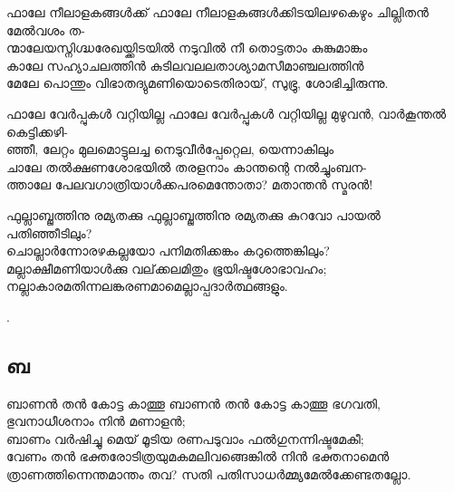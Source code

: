 \begin{enumerate}
\begin{slokam}{\VSr}{\KND}{ഫാലേ നീലാളകങ്ങൾക്ക്}
ഫാലേ നീലാളകങ്ങള്‍ക്കിടയിലഴകെഴും ചില്ലിതൻ മേൽവശം ത-\\
ന്മാലേയസ്നിഗ്ദ്ധരേഖയ്ക്കിടയിൽ നടുവിൽ നീ തൊട്ടതാം കുങ്കുമാങ്കം\\
കാലേ സഹ്യാചലത്തിൻ കുടിലവലലതാശ്യാമസീമാഞ്ചലത്തിൻ\\
മേലേ പൊന്തും വിഭാതദ്യുമണിയൊടെതിരായ്‌, സുഭ്രു, ശോഭിച്ചിരുന്നു.
\end{slokam}


\begin{slokam}{\VSv}{\VNM}{ഫാലേ വേർപ്പുകള്‍ വറ്റിയില്ല}
 ഫാലേ വേർപ്പുകള്‍ വറ്റിയില്ല മുഴുവൻ, വാർകൂന്തൽ കെട്ടിക്കഴി-\\
ഞ്ഞീ, ലേറ്റം മുലമൊട്ടുലച്ച നെടുവീർപ്പേറ്റെല, യെന്നാകിലും\\
ചാലേ തൽക്ഷണശോഭയിൽ തരളനാം കാന്തന്റെ നൽച്ചുംബന-\\
ത്താലേ പേലവഗാത്രിയാള്‍ക്കപരമെന്തോതാ? മതാന്തൻ സ്മരൻ!
\end{slokam}



\begin{slokam}{\VSv}{\KV}{ഫുല്ലാബ്ജത്തിനു രമ്യതക്കു}
ഫുല്ലാബ്ജത്തിനു രമ്യതക്കു കുറവോ പായല്‍ പതിഞ്ഞീടിലും?\\
ചൊല്ലാര്‍ന്നോരഴകല്ലയോ പനിമതിക്കങ്കം കറുത്തെങ്കിലും?\\
മല്ലാക്ഷീമണിയാള്‍ക്കു വല്‌ക്കലമിതും ഭൂയിഷ്ടശോഭാവഹം;\\
നല്ലാകാരമതിന്നലങ്കരണമാമെല്ലാപ്പദാര്‍ത്ഥങ്ങളും.
\end{slokam}


.

\end{enumerate}
\subsection{ബ}
\begin{enumerate}

\begin{slokam}{\VSr}{\VNM}{ബാണൻ തൻ കോട്ട കാത്തൂ}
ബാണൻ തൻ കോട്ട കാത്തൂ ഭഗവതി, ഭുവനാധീശനാം നിൻ മണാളൻ;\\
ബാണം വർഷിച്ചു മെയ്‌ മൂടിയ രണപടുവാം ഫൽഗുനന്നിഷ്ടമേകീ;\\
വേണം തൻ ഭക്തരോടിത്രയുമകമലിവങ്ങെങ്കിൽ നിൻ ഭക്തനാമെൻ\\
ത്രാണത്തിന്നെന്തമാന്തം തവ? സതി പതിസാധർമ്മ്യമേൽക്കേണ്ടതല്ലോ.

\end{slokam}



\end{enumerate}

